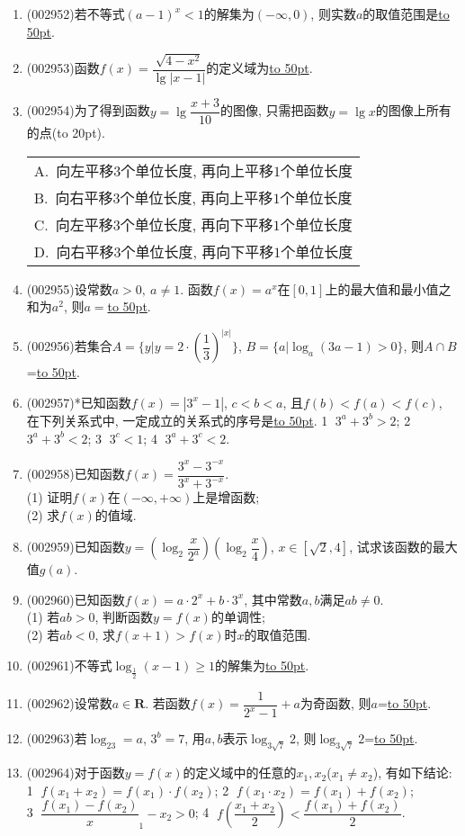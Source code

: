 \documentclass[10pt,a4paper]{article}
\newcommand{\blank}[1]{\underline{\hbox to #1pt{}}}
\newcommand{\bracket}[1]{(\hbox to #1pt{})}
\newcommand{\onech}[4]{\par\begin{tabular}{p{.9\textwidth}}
A.~#1\\
B.~#2\\
C.~#3\\
D.~#4
\end{tabular}}
\begin{document}
\begin{enumerate}[1.]
\item {\tiny (002952)}若不等式$(a-1)^x<1$的解集为$(-\infty,0)$, 则实数$a$的取值范围是\blank{50}.
\item {\tiny (002953)}函数$f(x)=\dfrac{\sqrt{4-x^2}}{\lg |x-1|}$的定义域为\blank{50}.
\item {\tiny (002954)}为了得到函数$y=\lg\dfrac{x+3}{10}$的图像, 只需把函数$y=\lg x$的图像上所有的点\bracket{20}.
\onech{向左平移$3$个单位长度, 再向上平移$1$个单位长度}{向右平移$3$个单位长度, 再向上平移$1$个单位长度}{向左平移$3$个单位长度, 再向下平移$1$个单位长度}{向右平移$3$个单位长度, 再向下平移$1$个单位长度}
\item {\tiny (002955)}设常数$a>0,\ a\ne 1$. 函数$f(x)=a^x$在$[0,1]$上的最大值和最小值之和为$a^2$, 则$a=$\blank{50}.
\item {\tiny (002956)}若集合$A=\{y|y=2\cdot (\dfrac 13)^{|x|}\}$, $B=\{ a|\log_a(3a-1)>0\}$, 则$A\cap B$=\blank{50}.
\item {\tiny (002957)}*已知函数$f(x)=|3^x-1|$, $c<b<a$, 且$f(b)<f(a)<f(c)$, 在下列关系式中, 一定成立的关系式的序号是\blank{50}.
\textcircled{1} $3^a+3^b>2$; \textcircled{2} $3^a+3^b<2$; \textcircled{3} $3^c<1$; \textcircled{4} $3^a+3^c<2$.
\item {\tiny (002958)}已知函数$f(x)=\dfrac{3^x-3^{-x}}{3^x+3^{-x}}$.\\
(1) 证明$f(x)$在$(-\infty,+\infty)$上是增函数;\\
(2) 求$f(x)$的值域.
\item {\tiny (002959)}已知函数$y=(\log_2\dfrac x{2^a})(\log_2\dfrac x4)$, $x\in [\sqrt 2,4]$, 试求该函数的最大值$g(a)$.
\item {\tiny (002960)}已知函数$f(x)=a\cdot 2^x+b\cdot 3^x$, 其中常数$a,b$满足$ab\ne 0$.\\
(1) 若$ab>0$, 判断函数$y=f(x)$的单调性;\\
(2) 若$ab<0$, 求$f(x+1)>f(x)$时$x$的取值范围.
\item {\tiny (002961)}不等式$\log_{\frac 12}(x-1)\ge 1$的解集为\blank{50}.
\item {\tiny (002962)}设常数$a\in \mathbf{R}$. 若函数$f(x)=\dfrac 1{2^x-1}+a$为奇函数, 则$a$=\blank{50}.
\item {\tiny (002963)}若$\log_23=a$, $3^b=7$, 用$a,b$表示$\log_{3\sqrt 7}2$, 则$\log_{3\sqrt 7}2$=\blank{50}.
\item {\tiny (002964)}对于函数$y=f(x)$的定义域中的任意的$x_1,x_2$($x_1\ne x_2$), 有如下结论:\\
\textcircled{1} $f(x_1+x_2)=f(x_1)\cdot f(x_2)$; \textcircled{2} $f(x_1\cdot x_2)=f(x_1)+f(x_2)$;\\ \textcircled{3} $\dfrac{f(x_1)-f(x_2)}x_1-x_2>0$; \textcircled{4} $f(\dfrac{x_1+x_2}2)<\dfrac{f(x_1)+f(x_2)}2$. 

\end{enumerate}
\end{document}
